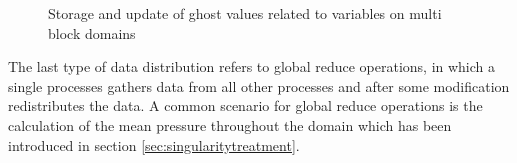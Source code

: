 \begin{figure}
  \centering
  \label{fig:segassemble}
  
  \caption{Storage and update of ghost values related to variables on multi block domains}
  \label{fig:ghosting}
\end{figure}


The last type of data distribution refers to global reduce operations, in which a single processes gathers data from all other processes and after some modification redistributes the data. A common scenario for global reduce operations is the calculation of the mean pressure throughout the domain which has been introduced in section \ref{sec:singularitytreatment}.


